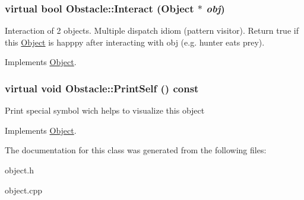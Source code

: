 \hypertarget{classObstacle_a53bec243dc8a00f23ec61c915aef4c3e}{
\subsubsection[{Interact}]{\setlength{\rightskip}{0pt plus 5cm}virtual bool Obstacle::Interact ({\bf Object} $\ast$ {\em obj})}}
\label{classObstacle_a53bec243dc8a00f23ec61c915aef4c3e}
Interaction of 2 objects. Multiple dispatch idiom (pattern visitor). Return true if this \hyperlink{classObject}{Object} is happpy after interacting with obj (e.g. hunter eats prey). 

Implements \hyperlink{classObject_a27d03e80827229de2ce885a0bc1c83c0}{Object}.

\hypertarget{classObstacle_ad4355e9d1db002f6db2ca15ae5605d05}{
\subsubsection[{PrintSelf}]{\setlength{\rightskip}{0pt plus 5cm}virtual void Obstacle::PrintSelf () const}}
\label{classObstacle_ad4355e9d1db002f6db2ca15ae5605d05}
Print special symbol wich helps to visualize this object 

Implements \hyperlink{classObject_a2c63e79dfa8626451b4a04b0b72294eb}{Object}.



The documentation for this class was generated from the following files:\begin{DoxyCompactItemize}
\item 
object.h\item 
object.cpp\end{DoxyCompactItemize}
